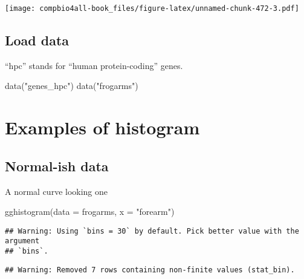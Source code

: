 \documentclass[
]{book}
\newenvironment{Shaded}{\begin{snugshade}}{\end{snugshade}}
\newcommand{\AttributeTok}[1]{\textcolor[rgb]{0.77,0.63,0.00}{#1}}
\newcommand{\FunctionTok}[1]{\textcolor[rgb]{0.00,0.00,0.00}{#1}}
\newcommand{\NormalTok}[1]{#1}
\newcommand{\StringTok}[1]{\textcolor[rgb]{0.31,0.60,0.02}{#1}}
\begin{document}
\texttt{[image: compbio4all-book\_files/figure-latex/unnamed-chunk-472-3.pdf]}

\hypertarget{load-data-3}{%
\subsection{Load data}\label{load-data-3}}

``hpc'' stands for ``human protein-coding'' genes.

\begin{Shaded}
\begin{Highlighting}[]
\FunctionTok{data}\NormalTok{(}\StringTok{"genes\_hpc"}\NormalTok{)}
\FunctionTok{data}\NormalTok{(}\StringTok{"frogarms"}\NormalTok{)}
\end{Highlighting}
\end{Shaded}

\hypertarget{section-1}{%
\section{}\label{section-1}}

\hypertarget{examples-of-histogram}{%
\section{Examples of histogram}\label{examples-of-histogram}}

\hypertarget{normal-ish-data}{%
\subsection{Normal-ish data}\label{normal-ish-data}}

A normal curve looking one

\begin{Shaded}
\begin{Highlighting}[]
\FunctionTok{gghistogram}\NormalTok{(}\AttributeTok{data =}\NormalTok{ frogarms,}
            \AttributeTok{x =} \StringTok{"forearm"}\NormalTok{)}
\end{Highlighting}
\end{Shaded}

\begin{verbatim}
## Warning: Using `bins = 30` by default. Pick better value with the argument
## `bins`.
\end{verbatim}

\begin{verbatim}
## Warning: Removed 7 rows containing non-finite values (stat_bin).
\end{verbatim}
\end{document}

